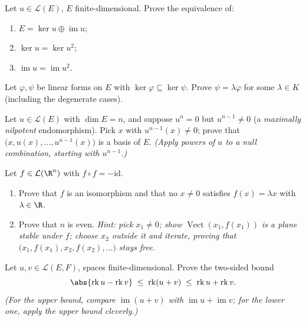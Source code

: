 \begin{exercise}[$\star\star$]\label{exo:b1:linmaps:7}
Let $u \in \mathcal{L}(E)$, $E$ finite-dimensional. Prove the
equivalence of:
\begin{enumerate}
  \item $E = \ker u \oplus \operatorname{im} u$;
  \item $\ker u = \ker u^2$;
  \item $\operatorname{im} u = \operatorname{im} u^2$.
\end{enumerate}
\end{exercise}

\begin{exercise}[$\star\star$]\label{exo:b1:linmaps:8}
Let $\varphi, \psi$ be linear forms on $E$ with $\ker\varphi
\subseteq \ker\psi$. Prove $\psi = \lambda\varphi$ for some
$\lambda \in K$ (including the degenerate cases).
\end{exercise}

\begin{exercise}[$\star\star\star$]\label{exo:b1:linmaps:9}
Let $u \in \mathcal{L}(E)$ with $\dim E = n$, and suppose $u^n = 0$
but $u^{n-1} \neq 0$ (a \emph{maximally nilpotent} endomorphism).
Pick $x$ with $u^{n-1}(x) \neq 0$; prove that $\bigl(x, u(x), \dots,
u^{n-1}(x)\bigr)$ is a basis of $E$. \emph{(Apply powers of $u$ to a
null combination, starting with $u^{n-1}$.)}
\end{exercise}

\begin{exercise}[$\star\star\star$]\label{exo:b1:linmaps:10}
Let $f \in \mathcal{L}(\R^n)$ with $f \circ f = -\mathrm{id}$.
\begin{enumerate}
  \item Prove that $f$ is an isomorphism and that no $x \neq 0$
        satisfies $f(x) = \lambda x$ with $\lambda \in \R$.
  \item Prove that $n$ is even. \emph{Hint: pick $x_1 \neq 0$; show
        $\operatorname{Vect}(x_1, f(x_1))$ is a plane stable under
        $f$; choose $x_2$ outside it and iterate, proving that
        $\bigl(x_1, f(x_1), x_2, f(x_2), \dots\bigr)$ stays free.}
\end{enumerate}
\end{exercise}

\begin{exercise}[$\star\star$]\label{exo:b1:linmaps:11}
Let $u, v \in \mathcal{L}(E, F)$, spaces finite-dimensional.
Prove the two-sided bound
\[
\abs{\operatorname{rk} u - \operatorname{rk} v}
\;\leq\; \operatorname{rk}(u + v)
\;\leq\; \operatorname{rk} u + \operatorname{rk} v .
\]
\emph{(For the upper bound, compare $\operatorname{im}(u+v)$ with
$\operatorname{im} u + \operatorname{im} v$; for the lower one,
apply the upper bound cleverly.)}
\end{exercise}

